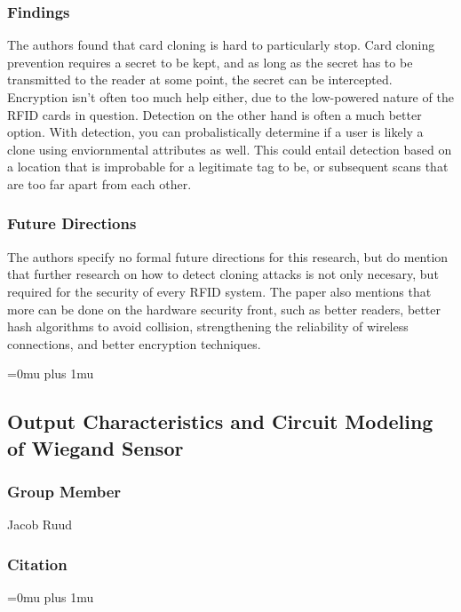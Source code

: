 \subsubsection{Findings}

\noindent
 The authors found that card cloning is hard to particularly stop.  Card cloning prevention requires a secret to be kept, and as long as the secret has to be transmitted to the reader at some point, the secret can be intercepted.  Encryption isn't often too much help either, due to the low-powered nature of the RFID cards in question.  Detection on the other hand is often a much better option.  With detection, you can probalistically determine if a user is likely a clone using enviornmental attributes as well.  This could entail detection based on a location that is improbable for a legitimate tag to be, or subsequent scans that are too far apart from each other.

\subsubsection{Future Directions}

\noindent
 The authors specify no formal future directions for this research, but do mention that further research on how to detect cloning attacks is not only necesary, but required for the security of every RFID system.  The paper also mentions that more can be done on the hardware security front, such as better readers, better hash algorithms to avoid collision, strengthening the reliability of wireless connections, and better encryption techniques. 

\Urlmuskip=0mu plus 1mu\relax

\noindent
\subsection{{O}utput {C}haracteristics and {C}ircuit {M}odeling of {W}iegand {S}ensor}

\subsubsection{Group Member}

\noindent
Jacob Ruud

\noindent
\subsubsection{Citation}

\Urlmuskip=0mu plus 1mu\relax

